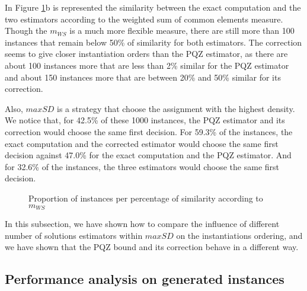 \documentclass[jair,twoside,11pt,theapa]{article}
\newcommand{\noteGilles}[1]  {{\color{red}{\sc \scriptsize [Gilles: #1]}}}
\begin{document}
In Figure \ref{similarityWCS}b is represented the similarity between the exact computation and the two estimators according to the weighted sum of common elements measure. Though the $m_{WS}$ is a much more flexible measure, there are still more than 100 instances that remain below 50\% of similarity for both estimators. The correction seems to give closer instantiation orders than the PQZ estimator, as there are about 100 instances more that are less than 2\% similar for the PQZ estimator and about 150 instances more that are between 20\% and 50\% similar for its correction.

Also, $maxSD$ is a strategy that choose the assignment with the highest density. We notice that, for 42.5\% of these 1000 instances, the PQZ estimator and its correction would choose the same first decision. For 59.3\% of the instances, the exact computation and the corrected estimator would choose the same first decision against 47.0\% for the exact computation and the PQZ estimator. And for 32.6\% of the instances, the three estimators would choose the same first decision.

\begin{figure}
  \begin{minipage}[c]{.46\linewidth}
     	 
	\end{minipage} \hfill
	\begin{minipage}[c]{.46\linewidth}
     	 
  	\end{minipage}
    \caption{Proportion of instances per percentage of similarity according to $m_{WS}$}
    \label{similarityWCS}
\end{figure}



In this subsection, we have shown how to compare the influence of different number of solutions estimators within $maxSD$ on the instantiations ordering, and we have shown that the PQZ bound and its correction behave in a different way.

\noteGilles{Puisque maxSD ne s'intéresse vraiment qu'à l'affectation correspondant à la densité la plus élevée, il serait bon d'indiquer la proportion d'exemplaires où chaque estimateur choisirait la même affectation (et en tenant compte des densités max à égalité).}

\subsection{Performance analysis on generated instances}
\label{experimentalPerformance}
\end{document}
